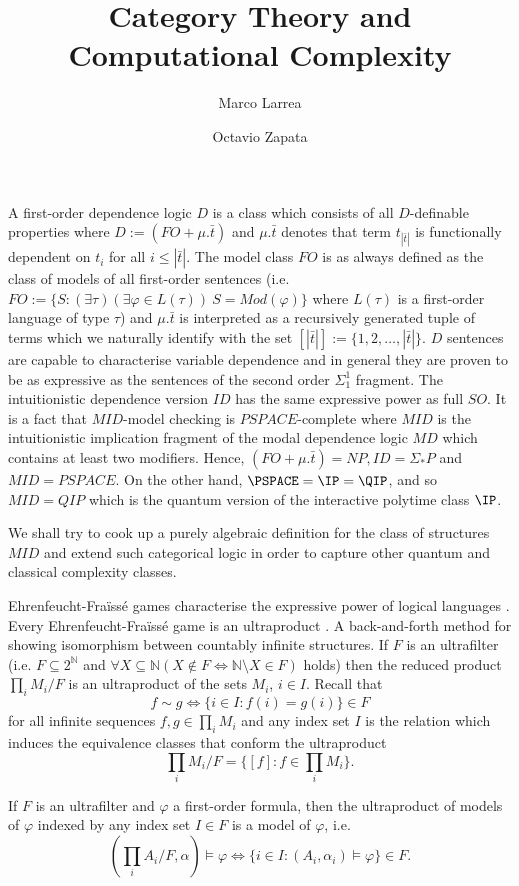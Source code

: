 

\title{Category Theory and \\ Computational Complexity}
\author{Marco Larrea \and Octavio Zapata}


\maketitle
A first-order dependence logic $D$ is a class which consists of all $D$-definable properties where $D := (FO + \mu.\bar{t})$ and $\mu.\bar{t}$ denotes that term $t_{|\bar{t}|}$ is functionally dependent on $t_{i}$ for all $i\leq |\bar{t}|$. The model class $FO$ is as always defined as the class of models of all first-order sentences (i.e. $FO:= \{S:(\exists\tau)(\exists\varphi\in L(\tau))\ S=Mod(\varphi)\}$ where $L(\tau)$ is a first-order language of type $\tau$) and $\mu.\bar{t}$ is interpreted as a recursively generated tuple of terms which we naturally identify with the set $[|\bar{t}|] := \{1,2,\dots,|\bar{t}|\}$. $D$ sentences are capable to characterise variable dependence and in general they are proven to be as expressive as the sentences of the second order $\Sigma_1^1$ fragment. The intuitionistic dependence version $ID$ has the same expressive power as full $SO$. It is a fact that $MID$-model checking is $PSPACE$-complete where $MID$ is the intuitionistic implication fragment of the modal dependence logic $MD$ which contains at least two modifiers. Hence, $(FO + \mu.\bar{t}) = NP, ID = \Sigma_{\ast}P$ and $MID = PSPACE$.  On the other hand, $\PSPACE = \IP = \QIP$, and so $MID = QIP$ which is the quantum version of the interactive polytime class $\IP$.

We shall try to cook up a purely algebraic definition for the class of structures $MID$ and extend such categorical logic in order to capture other quantum and classical complexity classes. 

Ehrenfeucht-Fra\"iss\'e games characterise the expressive power of logical languages \cite{ams}. Every Ehrenfeucht-Fra\"iss\'e game is an ultraproduct \cite{models}. A back-and-forth method for showing isomorphism between countably infinite structures. If $F$ is an ultrafilter (i.e. $F\subseteq 2^{\mathbb{N}}$ and $\forall X\subseteq\mathbb{N} (X\notin F \Leftrightarrow \mathbb{N}\setminus X\in F)$ holds) then the reduced product $\prod_{i}M_i / F$ is an ultraproduct of the sets $M_i$, $i\in I$. Recall that \[f\sim g \Leftrightarrow \{i\in I : f(i) = g(i)\}\in F\] for all infinite sequences $f,g\in\prod_i M_i$ and any index set $I$ is the relation which induces the equivalence classes that conform the ultraproduct \[\prod_{i}M_i / F = \{[f]:f\in\prod_i M_i\}.\] 

\begin{lem}[$\L$o\'s Lemma]
If $F$ is an ultrafilter and $\varphi$ a first-order formula, then the ultraproduct of models of $\varphi$ indexed by any index set $I\in F$ is a model of $\varphi$, i.e. \[(\prod_i A_i / F , \alpha)\models\varphi\Leftrightarrow\{i\in I: (A_i, \alpha_i)\models\varphi\}\in F.\]
\end{lem}

\nocite{*}




